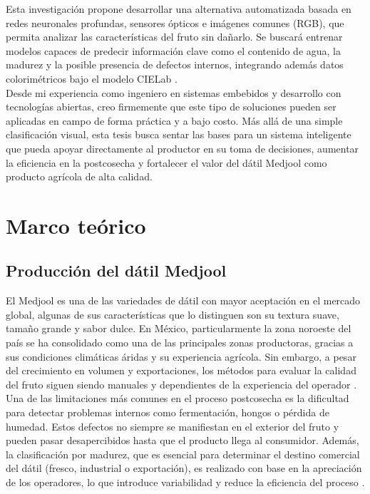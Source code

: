 Esta investigación propone desarrollar una alternativa automatizada basada en redes neuronales profundas, sensores ópticos e imágenes comunes (RGB), que permita analizar las características del fruto sin dañarlo. Se buscará entrenar modelos capaces de predecir información clave como el contenido de agua, la madurez y la posible presencia de defectos internos, integrando además datos colorimétricos bajo el modelo CIELab \parencite{habib_external_2022}.\\

Desde mi experiencia como ingeniero en sistemas embebidos y desarrollo con tecnologías abiertas, creo firmemente que este tipo de soluciones pueden ser aplicadas en campo de forma práctica y a bajo costo. Más allá de una simple clasificación visual, esta tesis busca sentar las bases para un sistema inteligente que pueda apoyar directamente al productor en su toma de decisiones, aumentar la eficiencia en la postcosecha y fortalecer el valor del dátil Medjool como producto agrícola de alta calidad.\\


\section{Marco teórico}

\subsection{Producción del dátil Medjool}

El Medjool es una de las variedades de dátil con mayor aceptación en el mercado global, algunas de sus características que lo distinguen son su textura suave, tamaño grande y sabor dulce. En México, particularmente la zona noroeste del país se ha consolidado como una de las principales zonas productoras, gracias a sus condiciones climáticas áridas y su experiencia agrícola. Sin embargo, a pesar del crecimiento en volumen y exportaciones, los métodos para evaluar la calidad del fruto siguen siendo manuales y dependientes de la experiencia del operador \parencite{salomon-torres_produccion_2017}.\\

Una de las limitaciones más comunes en el proceso postcosecha es la dificultad para detectar problemas internos como fermentación, hongos o pérdida de humedad. Estos defectos no siempre se manifiestan en el exterior del fruto y pueden pasar desapercibidos hasta que el producto llega al consumidor. Además, la clasificación por madurez, que es esencial para determinar el destino comercial del dátil (fresco, industrial o exportación), es realizado con base en la apreciación de los operadores, lo que introduce variabilidad y reduce la eficiencia del proceso \parencite{perez-perez_evaluation_2021}.\\

